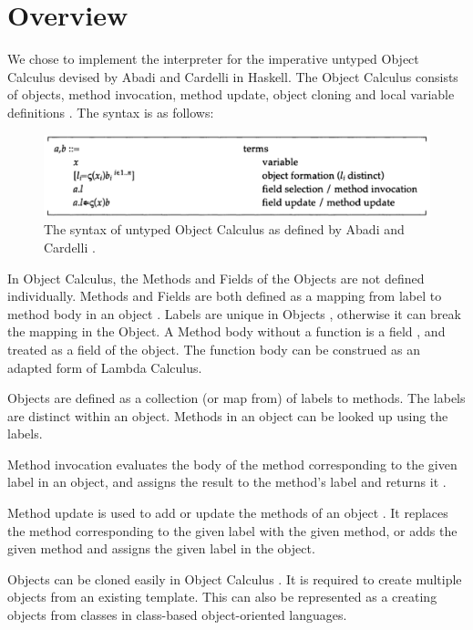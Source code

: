 \documentclass[10pt,twocolumn]{article}
\begin{document}
\section{Overview}

We chose to implement the interpreter for  the imperative untyped Object Calculus devised by Abadi and Cardelli in Haskell. The Object Calculus consists of objects, method invocation, method update, object cloning and local variable definitions \cite{ex1,ex11}. The syntax is as follows: 

\begin{figure}[thpb]
  \centering
  	\includegraphics[width=\columnwidth]{syntax}
    \caption{The syntax of untyped Object Calculus as defined by Abadi and Cardelli \cite{ex1}. }
	\label{fig:syntax}
\end{figure}

In Object Calculus, the Methods and Fields of the Objects are not defined individually. Methods and Fields are both defined as a mapping from label to method body in an object \cite{ex11}. Labels are unique in Objects \cite{ex11}, otherwise it can break the mapping in the Object. A Method body without a function is a field \cite{ex1}, and treated as a field of the object. The function body can be construed as an adapted form of Lambda Calculus. 

Objects are defined as a collection (or map from) of labels to methods. The labels are distinct within an object. Methods in an object can be looked up using the labels. 

Method invocation evaluates the body of the method corresponding to the given label in an object, and assigns the result to the method's label and returns it \cite{ex11}. 

Method update is used to add or update the methods of an object \cite{ex1}. It replaces the method corresponding to the given label with the given method, or adds the given method and assigns the given label in the object. 

Objects can be cloned easily in Object Calculus \cite{ex11}. It is required to create multiple objects from an existing template. This can also be represented as a creating objects from classes in class-based object-oriented languages. 
\end{document}
